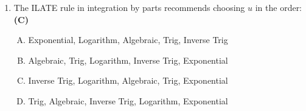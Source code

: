 \documentclass[10pt,a4paper]{article}
\begin{document}
\begin{enumerate}[1.]
\item The ILATE rule in integration by parts recommends choosing $u$ in the order: \hfill \textbf{(C)}
\begin{enumerate}[(A)]
    \item Exponential, Logarithm, Algebraic, Trig, Inverse Trig
    \item Algebraic, Trig, Logarithm, Inverse Trig, Exponential
    \item Inverse Trig, Logarithm, Algebraic, Trig, Exponential
    \item Trig, Algebraic, Inverse Trig, Logarithm, Exponential
\end{enumerate}

\end{enumerate}

\end{document}
